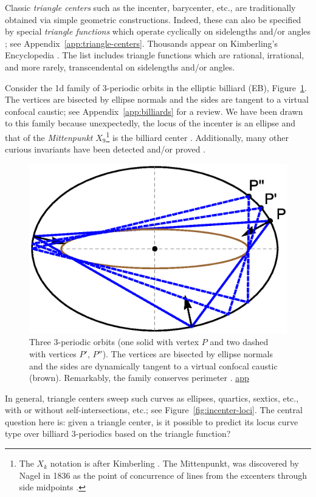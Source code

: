 Classic {\em triangle centers} such as the incenter, barycenter, etc., are traditionally obtained via simple geometric constructions. Indeed, these can also be specified by special {\em triangle functions} which operate cyclically on sidelengths and/or angles \cite{kimberling1993_rocky}; see Appendix~\ref{app:triangle-centers}. Thousands appear on Kimberling's Encyclopedia  \cite{etc}. The list includes triangle functions which are rational, irrational, and more rarely, transcendental on sidelengths and/or angles. 

Consider the 1d family of 3-periodic orbits in the elliptic billiard (EB), Figure~\ref{fig:3-periodics}. The vertices are bisected by ellipse normals and the sides are tangent to a virtual confocal caustic; see Appendix~\ref{app:billiards} for a review. We have been drawn to this family because unexpectedly, the locus of the incenter is an ellipse and that of the {\em Mittenpunkt} $X_9$\footnote{The $X_k$ notation is after Kimberling \cite{etc}. The Mittenpunkt, was discovered by Nagel in 1836 as the point of concurrence of lines from the excenters through side midpoints \cite{mw}.} is the billiard center \cite{reznik2020-intelligencer}. Additionally, many other curious invariants have been detected and/or proved \cite{akopyan2020-invariants,bialy2020-invariants,reznik2020-invariants}. 

\begin{figure}
    \centering
    \includegraphics[width=.5\textwidth]{pics_1005_three_orbits_proofs.eps}
    \caption{Three 3-periodic orbits (one solid with vertex $P$ and two dashed with vertices $P'$, $P''$). The vertices are bisected by ellipse normals and the sides are dynamically tangent to a virtual confocal caustic (brown). Remarkably, the family conserves perimeter \cite{sergei91}. \href{https://bit.ly/38oncCD}{app}}
    \label{fig:3-periodics}
\end{figure}

In general, triangle centers sweep such curves as ellipses, quartics, sextics, etc., with or without self-intersections, etc.; see Figure~\ref{fig:incenter-loci}. The central question here is: given a triangle center, is it possible to predict its locus curve type over billiard 3-periodics based on the triangle function?

